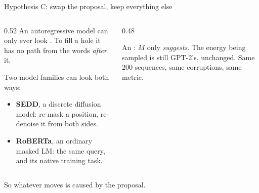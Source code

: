 \documentclass{beamer}
\begin{document}
\begin{frame}{Hypothesis C: swap the proposal, keep everything else}
  \begin{columns}[T]
    \begin{column}{0.52\textwidth}
      \small
      An autoregressive model can only ever look . To fill a hole it has no path
      from the words \emph{after} it.
      \vspace{0.4em}

      Two model families can look both ways:
      \begin{itemize}\small
        \item \textbf{SEDD}, a discrete diffusion model: re-mask a position, re-denoise it from both sides.
        \item \textbf{RoBERTa}, an ordinary masked LM: the same query, and its native training task.
      \end{itemize}
    \end{column}
    \begin{column}{0.48\textwidth}
      \begin{center}
      \end{center}
      \vspace{0.3em}
      {\scriptsize An : $M$ only \emph{suggests}. The energy being
      sampled is still GPT-2's, unchanged. Same $200$ sequences, same corruptions, same metric.}
    \end{column}
  \end{columns}
  \vspace{0.3em}
  \begin{center}\small
   So whatever moves is caused by the proposal.
  \end{center}
\end{frame}
\end{document}
